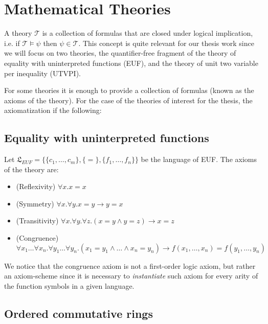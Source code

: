 \section{Mathematical Theories} \label{math_theories}

A theory $\mathcal{T}$ is a collection of formulas that are closed under logical implication, i.e. if $\mathcal{T} \models \psi$ then $\psi \in \mathcal{T}$. This concept is quite relevant for our thesis work since we will focus on two theories, the quantifier-free fragment of the theory of equality with uninterpreted functions (EUF), and the theory of unit two variable per inequality (UTVPI). 

For some theories it is enough to provide a collection of formulas (known as the axioms of the theory). For the case of the theories of interest for the thesis, the axiomatization if the following:

\subsection{Equality with uninterpreted functions}

\begin{definition} \label{euf_axioms}
  Let $\mathfrak{L}_{EUF} = \{ \{c_1, \dots, c_m \}, \{ = \}, \{ f_1, \dots, f_n \} \}$ be the language of EUF. The axioms of the theory are:
  \begin{itemize}
    \item (Reflexivity) $\forall x . x = x$
    \item (Symmetry) $\forall x . \forall y . x = y \rightarrow y = x$
    \item (Transitivity) $\forall x . \forall y . \forall z. (x = y \land y = z) \rightarrow x = z$
    \item (Congruence) $\forall x_1  \dots \forall x_n . \forall y_1 \dots \forall y_n . (x_1 = y_1 \land \dots \land x_n = y_n) \rightarrow f(x_1, \dots, x_n) = f(y_1, \dots, y_n) $
  \end{itemize}
\end{definition}

We notice that the congruence axiom is not a first-order logic axiom, but rather an axiom-scheme since it is necessary to \emph{instantiate} such axiom for every arity of the function symbols in a given language.

\subsection{Ordered commutative rings}

